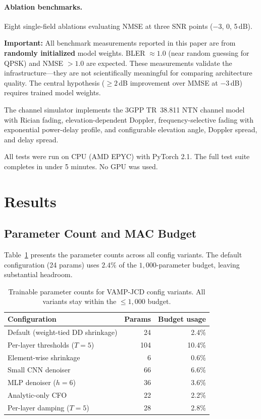 \documentclass{article}
\begin{document}
\paragraph{Ablation benchmarks.} Eight single-field ablations evaluating NMSE at three SNR points ($-3$, 0, 5\,dB).

\noindent\textbf{Important:} All benchmark measurements reported in this paper are from \textbf{randomly initialized} model weights. BLER $\approx 1.0$ (near random guessing for QPSK) and NMSE $> 1.0$ are expected. These measurements validate the infrastructure---they are not scientifically meaningful for comparing architecture quality. The central hypothesis ($\geq 2$\,dB improvement over MMSE at $-3$\,dB) requires trained model weights.

The channel simulator implements the 3GPP TR~38.811 NTN channel model~\cite{3gppTR38811} with Rician fading, elevation-dependent Doppler, frequency-selective fading with exponential power-delay profile, and configurable elevation angle, Doppler spread, and delay spread.

All tests were run on CPU (AMD EPYC) with PyTorch 2.1. The full test suite completes in under 5 minutes. No GPU was used.

\section{Results}
\label{sec:results}

\subsection{Parameter Count and MAC Budget}

Table~\ref{tab:params} presents the parameter counts across all config variants. The default configuration (24 params) uses $2.4\%$ of the $1{,}000$-parameter budget, leaving substantial headroom.

\begin{table}[h]
  \centering
  \caption{Trainable parameter counts for VAMP-JCD config variants. All variants stay within the $\leq 1{,}000$ budget.}
  \label{tab:params}
  \begin{tabular}{@{}lrr@{}}
    \toprule
    Configuration & Params & Budget usage \\
    \midrule
    Default (weight-tied DD shrinkage) & 24 & 2.4\% \\
    Per-layer thresholds ($T=5$) & 104 & 10.4\% \\
    Element-wise shrinkage & 6 & 0.6\% \\
    Small CNN denoiser & 66 & 6.6\% \\
    MLP denoiser ($h=6$) & 36 & 3.6\% \\
    Analytic-only CFO & 22 & 2.2\% \\
    Per-layer damping ($T=5$) & 28 & 2.8\% \\
    \bottomrule
  \end{tabular}
\end{table}
\end{document}
